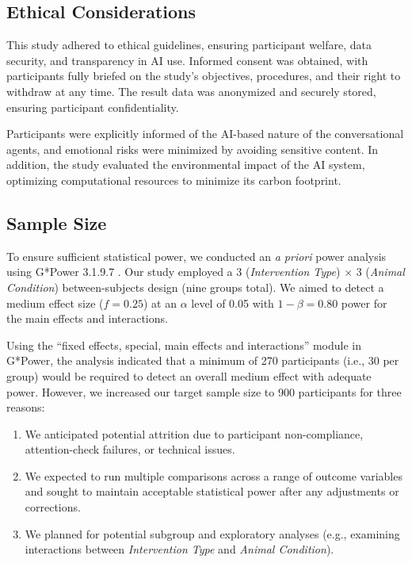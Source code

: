 \documentclass[sigconf, nonacm]{acmart}
\begin{document}
\subsection{Ethical Considerations}
This study adhered to ethical guidelines, ensuring participant welfare, data security, and transparency in AI use. Informed consent was obtained, with participants fully briefed on the study’s objectives, procedures, and their right to withdraw at any time. The result data was anonymized and securely stored, ensuring participant confidentiality.

Participants were explicitly informed of the AI-based nature of the conversational agents, and emotional risks were minimized by avoiding sensitive content. In addition, the study evaluated the environmental impact of the AI system, optimizing computational resources to minimize its carbon footprint.

\subsection{Sample Size}
To ensure sufficient statistical power, we conducted an \textit{a priori} power analysis using G*Power 3.1.9.7 \cite{Erdfelder2009}. Our study employed a 3 (\textit{Intervention Type}) $\times$ 3 (\textit{Animal Condition}) between-subjects design (nine groups total). We aimed to detect a medium effect size ($f = 0.25$) at an $\alpha$ level of 0.05 with $1-\beta=0.80$ power for the main effects and interactions.

Using the ``fixed effects, special, main effects and interactions'' module in G*Power, the analysis indicated that a minimum of 270 participants (i.e., 30 per group) would be required to detect an overall medium effect with adequate power. However, we increased our target sample size to 900 participants for three reasons:
\begin{enumerate}
    \item We anticipated potential attrition due to participant non-compliance, attention-check failures, or technical issues.
    \item We expected to run multiple comparisons across a range of outcome variables and sought to maintain acceptable statistical power after any adjustments or corrections.
    \item We planned for potential subgroup and exploratory analyses (e.g., examining interactions between \textit{Intervention Type} and \textit{Animal Condition}).
\end{enumerate}
\end{document}
